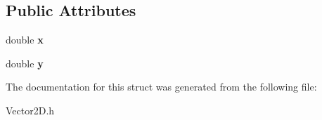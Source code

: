 \subsection*{Public Attributes}
\begin{DoxyCompactItemize}
\item 
\mbox{\label{structVector2D_ac5c4e553815737aa24bec8281270178f}} 
double {\bfseries x}
\item 
\mbox{\label{structVector2D_ac38d0179cfe74c30fee290a703ab209a}} 
double {\bfseries y}
\end{DoxyCompactItemize}


The documentation for this struct was generated from the following file\+:\begin{DoxyCompactItemize}
\item 
Vector2\+D.\+h\end{DoxyCompactItemize}
